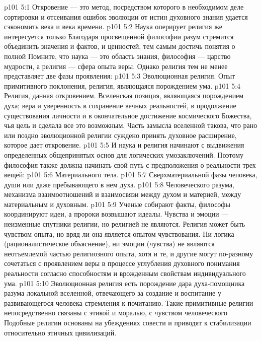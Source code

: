 \vs p101 5:1 Откровение --- это метод, посредством которого в необходимом деле сортировки и отсеивания ошибок эволюции от истин духовного знания удается сэкономить века и века времени.
\vs p101 5:2 Наука оперирует  религия же интересуется только  Благодаря просвещенной философии разум стремится объединить значения и фактов, и ценностей, тем самым достичь понятия о полной  Помните, что наука --- это область знания, философия --- царство мудрости, а религия --- сфера опыта веры. Однако религия тем не менее представляет две фазы проявления:
\vs p101 5:3 \bibnobreakspace Эволюционная религия. Опыт примитивного поклонения, религия, являющаяся порождением ума.
\vs p101 5:4 \bibnobreakspace Религия, данная откровением. Вселенская позиция, являющаяся порождением духа; вера и уверенность в сохранение вечных реальностей, в продолжение существования личности и в окончательное достижение космического Божества, чья цель и сделала все это возможным. Часть замысла вселенной такова, что рано или поздно эволюционной религии суждено принять духовное расширение, которое дает откровение.
\vs p101 5:5 \pc И наука и религия начинают с выдвижения определенных общепринятых основ для логических умозаключений. Поэтому философия также должна начинать свой путь с предположения о реальности трех вещей:
\vs p101 5:6 \bibnobreakspace Материального тела.
\vs p101 5:7 \bibnobreakspace Сверхматериальной фазы человека, души или даже пребывающего в нем духа.
\vs p101 5:8 \bibnobreakspace Человеческого разума, механизма взаимоотношений и взаимосвязи между духом и материей, между материальным и духовным.
\vs p101 5:9 \pc Ученые собирают факты, философы координируют идеи, а пророки возвышают идеалы. Чувства и эмоции --- неизменные спутники религии, но религией не являются. Религия может быть чувством опыта, но вряд ли она является опытом чувствования. Ни логика (рационалистическое объяснение), ни эмоции (чувства) не являются неотъемлемой частью религиозного опыта, хотя и те, и другие могут по\hyp{}разному сочетаться с проявлением веры в процессе углубления духовного понимания реальности согласно способностям и врожденным свойствам индивидуального ума.
\vs p101 5:10 Эволюционная религия есть порождение дара духа\hyp{}помощника разума локальной вселенной, отвечающего за создание и воспитание у развивающегося человека стремления к почитанию. Такие примитивные религии непосредственно связаны с этикой и моралью, с чувством человеческого  Подобные религии основаны на убеждениях совести и приводят к стабилизации относительно этичных цивилизаций.

